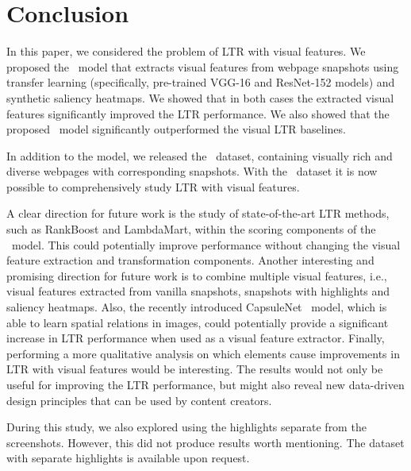 
\section{Conclusion}
In this paper, we considered the problem of \ac{LTR} with visual features.
We proposed the \modelname~model that extracts visual features from webpage snapshots
using transfer learning (specifically, pre-trained VGG-16 and ResNet-152 models) and synthetic saliency heatmaps.
We showed that in both cases the extracted visual features significantly improved the \ac{LTR} performance.
We also showed that the proposed \modelname~model significantly outperformed the visual \ac{LTR} baselines.

In addition to the model, we released the \datasetname~dataset, containing visually rich and diverse webpages with corresponding snapshots.
With the \datasetname~dataset it is now possible to comprehensively study \ac{LTR} with visual features.

A clear direction for future work is the study of state-of-the-art \ac{LTR} methods, such as RankBoost and LambdaMart, within the scoring components of the \modelname~model.
This could potentially improve performance without changing the visual feature extraction and transformation components.
Another interesting and promising direction for future work is to combine multiple visual features,
i.e., visual features extracted from vanilla snapshots, snapshots with highlights and saliency heatmaps.
Also, the recently introduced CapsuleNet~\cite{sabour2017dynamic} model, which is able to learn spatial relations in images, could potentially provide a significant increase in \ac{LTR} performance when used as a visual feature extractor.
Finally, performing a more qualitative analysis on which elements cause improvements in \ac{LTR} with visual features would be interesting. 
The results would not only be useful for improving the \ac{LTR} performance, but might also reveal new data-driven design principles that can be used by content creators.

During this study, we also explored using the highlights separate from the screenshots. 
However, this did not produce results worth mentioning. 
The dataset with separate highlights is available upon request. 
\fi